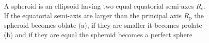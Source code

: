\begin{figure}[htb]
\begin{center}
\end{center}
\caption{A spheroid is an ellipsoid having two equal equatorial semi-axes $R_\mathrm{e}$. If the equatorial
semi-axis are larger than the principal axis $R_\mathrm{p}$ the spheroid becomes oblate (a), if they are smaller
it becomes prolate (b) and if they are equal the spheroid becomes a perfect sphere}
\label{prolate oblate}
\end{figure}

